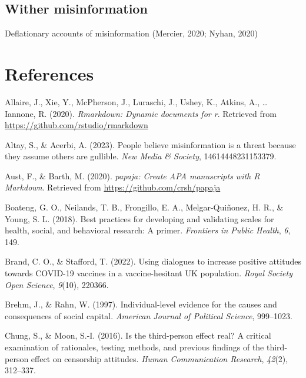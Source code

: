\documentclass[
  ,jou,floatsintext]{apa6}
\newlength{\cslhangindent}
\newlength{\cslentryspacingunit} %
\newenvironment{CSLReferences}[2] %
 {%
  \setlength{\parindent}{0pt}
  \ifodd #1
  \let\oldpar\par
  \def\par{\hangindent=\cslhangindent\oldpar}
  \fi
  \setlength{\parskip}{#2\cslentryspacingunit}
 }%
 {}
\begin{document}
\hypertarget{wither-misinformation}{%
\subsection{Wither misinformation}\label{wither-misinformation}}

Deflationary accounts of misinformation (Mercier, 2020; Nyhan, 2020)

\hypertarget{references}{%
\section*{References}\label{references}}

\hypertarget{refs}{}
\begin{CSLReferences}{1}{0}
\leavevmode{}%
Allaire, J., Xie, Y., McPherson, J., Luraschi, J., Ushey, K., Atkins, A., \ldots{} Iannone, R. (2020). \emph{Rmarkdown: Dynamic documents for r}. Retrieved from \url{https://github.com/rstudio/rmarkdown}

\leavevmode{}%
Altay, S., \& Acerbi, A. (2023). People believe misinformation is a threat because they assume others are gullible. \emph{New Media \& Society}, 14614448231153379.

\leavevmode{}%
Aust, F., \& Barth, M. (2020). \emph{{papaja}: {Create} {APA} manuscripts with {R Markdown}}. Retrieved from \url{https://github.com/crsh/papaja}

\leavevmode{}%
Boateng, G. O., Neilands, T. B., Frongillo, E. A., Melgar-Quiñonez, H. R., \& Young, S. L. (2018). Best practices for developing and validating scales for health, social, and behavioral research: A primer. \emph{Frontiers in Public Health}, \emph{6}, 149.

\leavevmode{}%
Brand, C. O., \& Stafford, T. (2022). Using dialogues to increase positive attitudes towards COVID-19 vaccines in a vaccine-hesitant UK population. \emph{Royal Society Open Science}, \emph{9}(10), 220366.

\leavevmode{}%
Brehm, J., \& Rahn, W. (1997). Individual-level evidence for the causes and consequences of social capital. \emph{American Journal of Political Science}, 999--1023.

\leavevmode{}%
Chung, S., \& Moon, S.-I. (2016). Is the third-person effect real? A critical examination of rationales, testing methods, and previous findings of the third-person effect on censorship attitudes. \emph{Human Communication Research}, \emph{42}(2), 312--337.


\end{CSLReferences}
\end{document}
